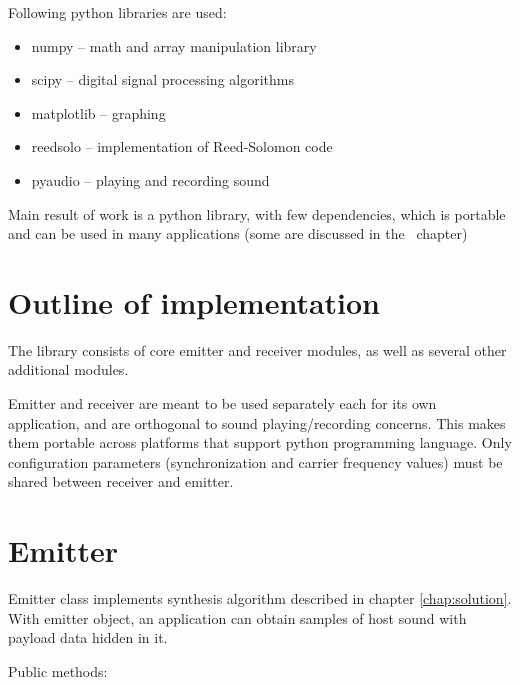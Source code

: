 \documentclass[english,bachelor,a4paper,oneside]{ppfcmthesis}
\begin{document}
Following python libraries are used:

\begin{itemize}
  \item numpy -- math and array manipulation library
  \item scipy -- digital signal processing algorithms
  \item matplotlib -- graphing
  \item reedsolo -- implementation of Reed-Solomon code
  \item pyaudio -- playing and recording sound
\end{itemize}

Main result of work is a python library, with few dependencies, which is portable and can be used in many applications (some are discussed in the~ chapter)

\section{Outline of implementation}

The library consists of core emitter and receiver modules, as well as several other additional modules.

Emitter and receiver are meant to be used separately each for its own application, and are orthogonal
to sound playing/recording concerns. This makes them portable across platforms that support python programming language.
Only configuration parameters (synchronization and carrier frequency values) must be shared between receiver and emitter.

\clearpage

\section{Emitter}

Emitter class implements synthesis algorithm described in chapter \ref{chap:solution}. With emitter object, an application can obtain samples of host sound with payload data hidden in it.

Public methods:
\end{document}
